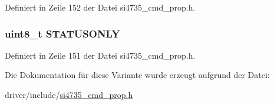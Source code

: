 Definiert in Zeile 152 der Datei si4735\+\_\+cmd\+\_\+prop.\+h.

\hypertarget{unionfm__rds__status__arg1_a696c0636e08a68f420bc7da0ae8aeed1}{}
\subsubsection[{S\+T\+A\+T\+U\+S\+O\+N\+L\+Y}]{\setlength{\rightskip}{0pt plus 5cm}uint8\+\_\+t S\+T\+A\+T\+U\+S\+O\+N\+L\+Y}\label{unionfm__rds__status__arg1_a696c0636e08a68f420bc7da0ae8aeed1}


Definiert in Zeile 151 der Datei si4735\+\_\+cmd\+\_\+prop.\+h.



Die Dokumentation für diese Variante wurde erzeugt aufgrund der Datei\+:\begin{DoxyCompactItemize}
\item 
driver/include/\hyperlink{si4735__cmd__prop_8h}{si4735\+\_\+cmd\+\_\+prop.\+h}\end{DoxyCompactItemize}
